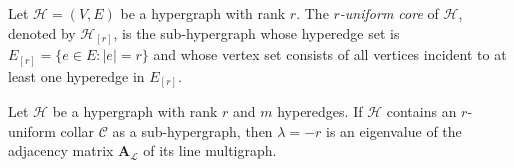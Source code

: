 \documentclass[12pt,reqno]{amsart}
\begin{document}
\begin{definition}\label{def:r_core}
Let $\mathcal{H} = (V, E)$ be a hypergraph with rank $r$. The \textit{$r$-uniform core} of $\mathcal{H}$, denoted by $\mathcal{H}_{[r]}$, is the sub-hypergraph whose hyperedge set is $E_{[r]} = \{e \in E : |e| = r\}$ and whose vertex set consists of all vertices incident to at least one hyperedge in $E_{[r]}$.
\end{definition}

\begin{theorem}\label{teo:collar_eigenvalue}
Let $\mathcal{H}$ be a hypergraph with rank $r$ and $m$ hyperedges. If $\mathcal{H}$ contains an $r$-uniform collar $\mathcal{C}$ as a sub-hypergraph, then $\lambda = -r$ is an eigenvalue of the adjacency matrix $\mathbf{A}_{\mathcal{L}}$ of its line multigraph.
\end{theorem}
\end{document}
